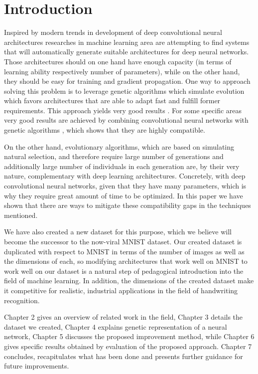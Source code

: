 \documentclass[eng]{simposium}
\begin{document}
\section{Introduction} 

Inspired by modern trends in development of deep convolutional neural architectures \cite{28,29} researches in machine  
learning area are attempting to find systems that will automatically generate suitable architectures for deep neural networks. 
Those architectures should on one hand have enough capacity (in terms of learning ability respectively number of parameters), while on  
the other hand, they should be easy for training and gradient propagation. 
One way to approach solving this problem is to leverage genetic algorithms which simulate evolution which favors architectures  
that are able to adapt fast and fulfill former requirements. 
This approach yields very good results \cite{5,30,31}.  
For some specific areas very good results are achieved by combining convolutional neural networks with genetic algorithms \cite{2,32}, 
which shows that they are highly compatible.  

On the other hand, evolutionary algorithms, which are based on simulating natural selection, and therefore require large number  
of generations and additionally large number of individuals in each generation are, by their very nature, complementary with deep learning architectures. 
Concretely, with deep convolutional neural networks, given that they have many parameters, which is why they require great  
amount of time to be optimized. 
In this paper we have shown that there are ways to mitigate these compatibility gaps in the techniques mentioned. 

We have also created a new dataset for this purpose, which we believe will become the successor to the now-viral MNIST dataset. 
Our created dataset is duplicated with respect to MNIST in terms of the number of images as well as the dimensions of each, 
so modifying architectures that work well on MNIST to work well on our dataset is a natural step of pedagogical introduction into the field of 
machine learning. In addition, the dimensions of the created dataset make it competitive for realistic, 
industrial applications in the field of handwriting recognition. 

Chapter 2 gives an overview of related work in the field, Chapter 3 details the dataset we created, 
Chapter 4 explains genetic representation of a neural network, 
Chapter 5 discusses the proposed improvement method, while Chapter 6 gives specific results obtained by evaluation of the proposed approach. 
Chapter 7 concludes, recapitulates what has been done and presents further guidance for future improvements. 
\end{document}
